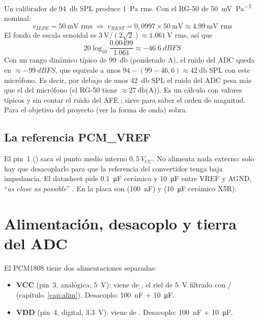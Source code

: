 \begin{calculo}
Un calibrador de \SI{94}{\decibel} SPL produce \SI{1}{\pascal} rms. Con el RG-50 de \SI{50}{\milli\volt\per\pascal} nominal:
\[
v_{IEPE} = \SI{50}{\milli\volt} \text{ rms}\;\Rightarrow\; v_{REST}= 0{,}0997\times\SI{50}{\milli\volt}\approx\SI{4.99}{\milli\volt}\text{ rms}
\]
El fondo de escala senoidal es $\SI{3}{\volt}/(2\sqrt{2})\approx\SI{1.061}{\volt}$ rms, así que
\[
20\log_{10}\frac{\num{0.00499}}{\num{1.061}}\approx\SI{-46.6}{dBFS}
\]
Con un rango dinámico típico de \SI{99}{\decibel} (ponderado A), el ruido del ADC queda en $\approx\SI{-99}{dBFS}$, que equivale a unos $94-(99-46{,}6)\approx\SI{42}{\decibel}$ SPL con este micrófono. Es decir, por debajo de unos \SI{42}{\decibel} SPL el ruido del ADC pesa más que el del micrófono (el RG-50 tiene $\approx\SI{27}{\decibel}$(A)). Es un cálculo con valores típicos y sin contar el ruido del AFE \estimado; sirve para saber el orden de magnitud. Para el objetivo del proyecto (ver la forma de onda) sobra.
\end{calculo}

\subsection{La referencia PCM\_VREF}

El pin~1 () saca el punto medio interno $0{,}5\,V_{CC}$. No alimenta nada externo: solo hay que desacoplarlo para que la referencia del convertidor tenga baja impedancia. El datasheet pide \SI{0.1}{\micro\farad} cerámico y \SI{10}{\micro\farad} entre VREF y AGND, ``\emph{as close as possible}'' . En la placa son  (\SI{100}{\nano\farad}) y  (\SI{10}{\micro\farad} cerámico X5R).

\section{Alimentación, desacoplo y tierra del ADC}\label{sec:c04-alim}

El PCM1808 tiene dos alimentaciones separadas:
\begin{itemize}
  \item \textbf{VCC} (pin~3, analógica, \SI{5}{\volt}): viene de , el riel de \SI{5}{\volt} filtrado con / (capítulo~\ref{cap:alim}). Desacoplo:  \SI{100}{\nano\farad} +  \SI{10}{\micro\farad}.
  \item \textbf{VDD} (pin~4, digital, \SI{3.3}{\volt}): viene de . Desacoplo:  \SI{100}{\nano\farad} +  \SI{10}{\micro\farad}.
\end{itemize}

